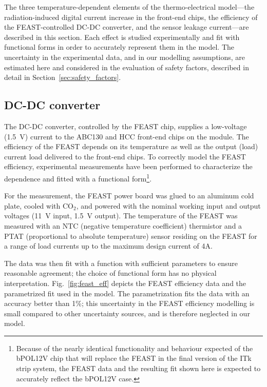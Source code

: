 
The three temperature-dependent elements of the thermo-electrical model---the
radiation-induced digital current increase in the front-end chips, the
efficiency of the FEAST-controlled DC-DC converter, and the sensor leakage current---are described in this section.
Each effect is studied experimentally and fit with functional forms
in order to accurately represent them in the model.
The uncertainty in the experimental data, and in our modelling assumptions,
are estimated here and considered in the evaluation of safety factors,
described in detail in Section~\ref{sec:safety_factors}.

\subsection{DC-DC converter}

The DC-DC converter, controlled by the FEAST chip, supplies a low-voltage (1.5~V) current to the ABC130 and HCC front-end
chips on the module.
The efficiency of the FEAST depends on its temperature as well as the output (load) current
load delivered to the front-end chips. To correctly model the FEAST efficiency, experimental
measurements have been performed to characterize the dependence and fitted with a functional form\footnote{
Because of the nearly identical functionality and behaviour expected of the bPOL12V chip
that will replace the FEAST in the final version of the ITk strip system,
the FEAST data and the resulting fit shown here is expected to accurately reflect the bPOL12V case.
}.

For the measurement, the FEAST power board was glued to an aluminum cold plate, cooled
with CO$_2$, and powered with the nominal working input and output voltages (11~V input, 1.5~V output).
The temperature of the FEAST was measured with an NTC (negative temperature coefficient) thermistor and a PTAT (proportional to absolute temperature) sensor residing on the FEAST
for a range of load currents up to the maximum design current of 4A.

The data was then fit with a function with sufficient parameters to ensure reasonable agreement; the
choice of functional form has no physical interpretation. Fig.~\ref{fig:feast_eff} depicts the
FEAST efficiency data and the parametrized fit used in the model. The parametrization fits the data
with an accuracy better than 1\%; this uncertainty in the FEAST efficiency modelling is small
compared to other uncertainty sources, and is therefore neglected in our model.

